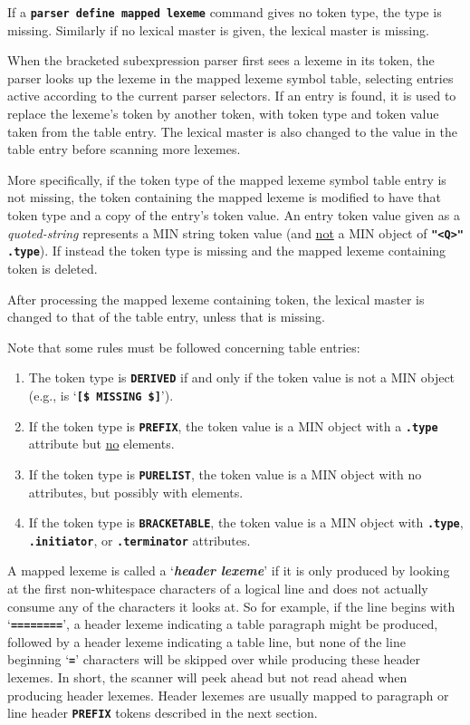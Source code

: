 \documentclass[12pt]{article}
\newcommand{\TT}[1]{{\tt \bfseries #1}}
\newcommand{\key}[1]{{\bf \em #1}\index{#1}}
\begin{document}
If a \TT{parser define mapped lexeme} command gives no token
type, the type is missing.  Similarly if no lexical master is
given, the lexical master is missing.

When the bracketed subexpression parser first sees a lexeme in
its token, the parser looks up the lexeme in the mapped lexeme
symbol table, selecting entries active according to the current
parser selectors.  If an entry is found, it is used to replace
the lexeme's token by another token, with token type and token
value taken from the table entry.  The lexical master is also
changed to the value in the table entry before scanning more
lexemes.

More specifically, if the token type of the mapped lexeme
symbol table entry is not missing, the token containing
the mapped lexeme is modified to have that token type and a copy of
the entry's token value.  An entry token value
given as a {\em quoted-string} represents a MIN string token
value (and \underline{not} a MIN object of \TT{"<Q>"} \TT{.type}).
If instead the token type is missing and the mapped lexeme
containing token is deleted.

After processing the mapped lexeme containing token, the lexical
master is changed to that of the table entry, unless that is missing.

Note that some rules must be followed concerning table entries:

\begin{enumerate}
\item The token type is \TT{DERIVED} if and only if the token value
is not a MIN object (e.g., is `\TT{[\$~MISSING~\$]}').
\item If the token type is \TT{PREFIX}, the token value is
a MIN object with a \TT{.type} attribute but \underline{no} elements.
\item If the token type is \TT{PURELIST}, the token value is
a MIN object with no attributes, but possibly with elements.
\item If the token type is \TT{BRACKETABLE}, the token value is
a MIN object with \TT{.type}, \TT{.ini\-ti\-a\-tor}, or \TT{.terminator}
attributes.
\end{enumerate}

A mapped lexeme is called a `\key{header lexeme}' if it is only
produced by looking
at the first non-whitespace characters of a logical line and does
not actually consume any of the characters it looks at.
So for example, if the
line begins with `\TT{========}', a header lexeme indicating
a table paragraph might be produced, followed by a header lexeme
indicating a table line, but none of the line beginning `\TT{=}'
characters will be skipped over while producing these header lexemes.
In short, the scanner will peek ahead but not read ahead when
producing header lexemes.  Header lexemes are usually mapped
to paragraph or line header \TT{PREFIX} tokens described in the
next section.
\end{document}
